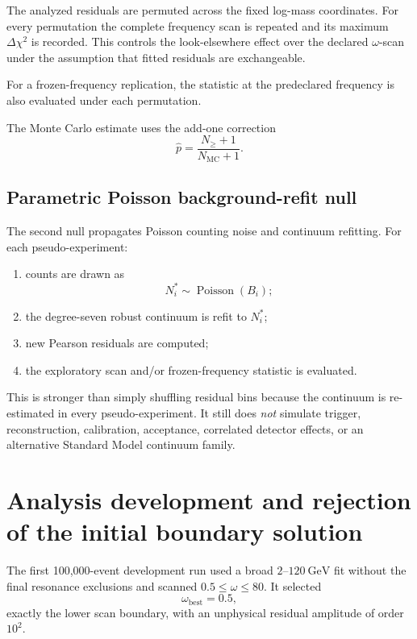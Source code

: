 \documentclass[11pt]{article}
\begin{document}
The analyzed residuals are permuted across the fixed log-mass coordinates.
For every permutation the complete frequency scan is repeated and its maximum
\(\Delta\chi^2\) is recorded.  This controls the look-elsewhere effect over the
declared \(\omega\)-scan under the assumption that fitted residuals are
exchangeable.

For a frozen-frequency replication, the statistic at the predeclared
frequency is also evaluated under each permutation.

The Monte Carlo estimate uses the add-one correction
\begin{equation}
\hat p
=
\frac{N_{\ge}+1}{N_{\mathrm{MC}}+1}.
\label{eq:addone}
\end{equation}

\subsection{Parametric Poisson background-refit null}

The second null propagates Poisson counting noise and continuum refitting.
For each pseudo-experiment:
\begin{enumerate}
    \item counts are drawn as
    \begin{equation}
    N_i^\ast\sim\operatorname{Poisson}(B_i);
    \end{equation}
    \item the degree-seven robust continuum is refit to \(N_i^\ast\);
    \item new Pearson residuals are computed;
    \item the exploratory scan and/or frozen-frequency statistic is evaluated.
\end{enumerate}

This is stronger than simply shuffling residual bins because the continuum is
re-estimated in every pseudo-experiment.  It still does \emph{not} simulate
trigger, reconstruction, calibration, acceptance, correlated detector effects,
or an alternative Standard Model continuum family.

\section{Analysis development and rejection of the initial boundary solution}

The first 100,000-event development run used a broad \(2\)--\(120~\mathrm{GeV}\)
fit without the final resonance exclusions and scanned
\(0.5\le\omega\le80\).  It selected
\begin{equation}
\omega_{\mathrm{best}}=0.5,
\end{equation}
exactly the lower scan boundary, with an unphysical residual amplitude of
order \(10^2\).
\end{document}
